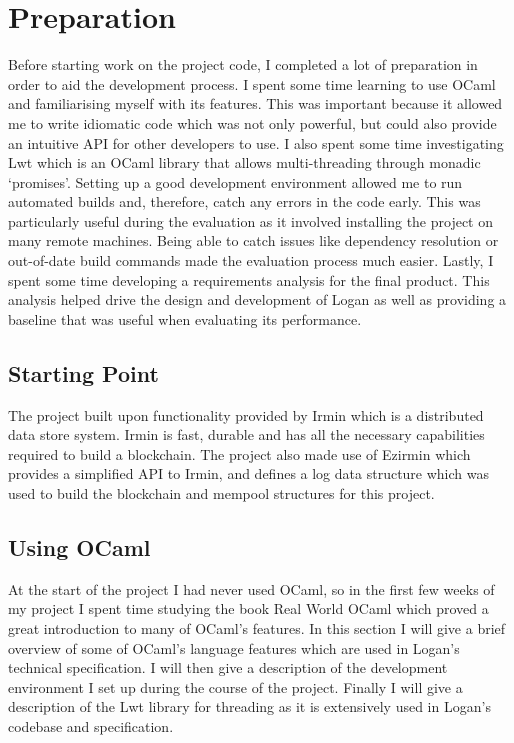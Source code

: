 \documentclass[12pt,a4paper,twoside,openright]{report}
\begin{document}
	\chapter{Preparation}
	Before starting work on the project code, I completed a lot of preparation in order to aid the development process.
	I spent some time learning to use OCaml and familiarising myself with its features.
	This was important because it allowed me to write idiomatic code which was not only powerful, but could also provide an intuitive API for other developers to use.
	I also spent some time investigating Lwt which is an OCaml library that allows multi-threading through monadic `promises'.
	Setting up a good development environment allowed me to run automated builds and, therefore, catch any errors in the code early.
	This was particularly useful during the evaluation as it involved installing the project on many remote machines.
	Being able to catch issues like dependency resolution or out-of-date build commands made the evaluation process much easier.
	Lastly, I spent some time developing a requirements analysis for the final product. 
	This analysis helped drive the design and development of Logan as well as providing a baseline that was useful when evaluating its performance.

	\section{Starting Point}
	The project built upon functionality provided by Irmin \parencite{Irmin} which is a distributed data store system. Irmin is fast, durable and has all the necessary capabilities required to build a blockchain.
	The project also made use of Ezirmin \parencite{Ezirmin} which provides a simplified API to Irmin, and defines a log data structure which was used to build the blockchain and mempool structures for this project. 

	\section{Using OCaml}
	At the start of the project I had never used OCaml, so in the first few weeks of my project I spent time studying the book Real World OCaml \parencite{RealWorldOCaml} which proved a great introduction to many of OCaml's features.  
	In this section I will give a brief overview of some of OCaml's language features which are used in Logan's technical specification.
	I will then give a description of the development environment I set up during the course of the project.
	Finally I will give a description of the Lwt library for threading as it is extensively used in Logan's codebase and specification.
\end{document}
